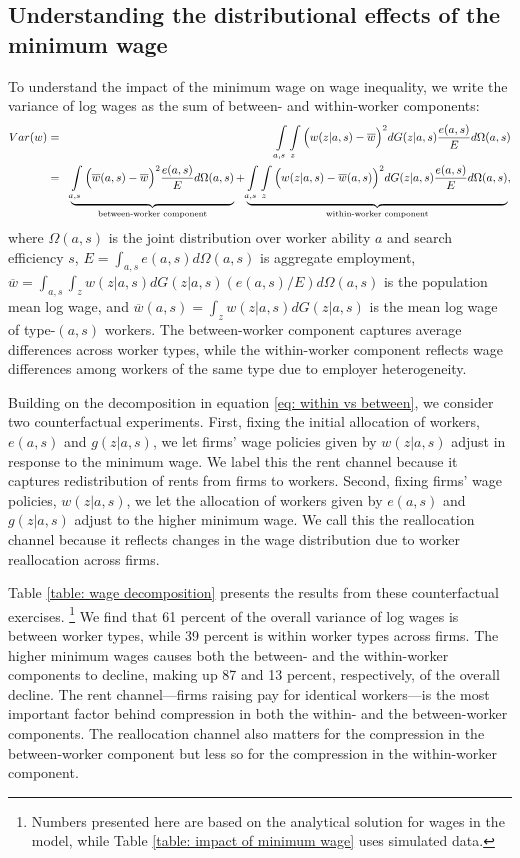 \subsection{Understanding the distributional effects of the minimum wage}

To understand the impact of the minimum wage on wage inequality, we write the variance of log wages as the sum of between- and within-worker components:
%
\begin{eqnarray}
  Var(w) &=& \int\displaylimits_{a,s} \int\displaylimits_z \Big( w(z|a,s) - \overline{w}\Big)^2 dG(z|a,s)\frac{e(a,s)}{E} d\Omega(a,s) \label{eq: within vs between} \\
  &=& \underbrace{\int\displaylimits_{a,s} \Big( \overline{w}(a,s) - \overline{w}\Big)^2 \frac{e(a,s)}{E} d\Omega(a,s)}_{\text{between-worker component}}
  + \underbrace{\int\displaylimits_{a,s} \int\displaylimits_z \Big( w(z|a,s) - \overline{w}(a,s)\Big)^2 dG(z|a,s)\frac{e(a,s)}{E} d\Omega(a,s)}_{\text{within-worker component}}, \nonumber
\end{eqnarray}
%
where $\Omega(a,s)$ is the joint distribution over worker ability $a$ and search efficiency $s$, $E=\int_{a,s} e(a,s) d\Omega(a,s)$ is aggregate employment, $\overline{w}=\int_{a,s}\int_z w(z|a,s) dG(z|a,s) (e(a,s)/E) d\Omega(a,s)$ is the population mean log wage, and $\overline{w}(a,s)=\int_z w(z|a,s) dG(z|a,s)$ is the mean log wage of type-$(a,s)$ workers. The between-worker component captures average differences across worker types, while the within-worker component reflects wage differences among workers of the same type due to employer heterogeneity.

Building on the decomposition in equation \eqref{eq: within vs between}, we consider two counterfactual experiments. First, fixing the initial allocation of workers, $e(a,s)$ and $g(z|a,s)$, we let firms' wage policies given by $w(z|a,s)$ adjust in response to the minimum wage. We label this the rent channel because it captures redistribution of rents from firms to workers. Second, fixing firms' wage policies, $w(z|a,s)$, we let the allocation of workers given by $e(a,s)$ and $g(z|a,s)$ adjust to the higher minimum wage. %
We call this the {reallocation channel} because it reflects changes in the wage distribution due to worker reallocation across firms.

Table \ref{table: wage decomposition} presents the results from these counterfactual exercises.%
%
\footnote{Numbers presented here are based on the analytical solution for wages in the model, while Table \ref{table: impact of minimum wage} uses simulated data.} %
We find that 61 percent of the overall variance of log wages is between worker types, while 39 percent is within worker types across firms. The higher minimum wages causes both the between- and the within-worker components to decline, making up 87 and 13 percent, respectively, of the overall decline. The rent channel---firms raising pay for identical workers---is the most important factor behind compression in both the within- and the between-worker components. The reallocation channel also matters for the compression in the between-worker component but less so for the compression in the within-worker component.


